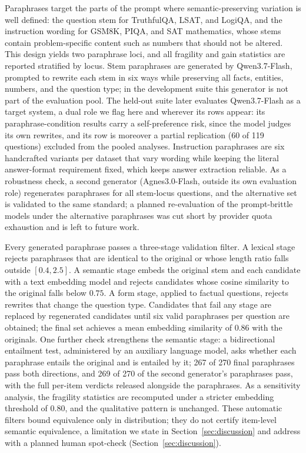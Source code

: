 Paraphrases target the parts of the prompt where semantic-preserving variation is well defined: the question stem for TruthfulQA, LSAT, and LogiQA, and the instruction wording for GSM8K, PIQA, and SAT mathematics, whose stems contain problem-specific content such as numbers that should not be altered. This design yields two paraphrase loci, and all fragility and gain statistics are reported stratified by locus. Stem paraphrases are generated by Qwen3.7-Flash, prompted to rewrite each stem in six ways while preserving all facts, entities, numbers, and the question type; in the development suite this generator is not part of the evaluation pool. The held-out suite later evaluates Qwen3.7-Flash as a target system, a dual role we flag here and wherever its rows appear: its paraphrase-condition results carry a self-preference risk, since the model judges its own rewrites, and its row is moreover a partial replication (60 of 119 questions) excluded from the pooled analyses. Instruction paraphrases are six handcrafted variants per dataset that vary wording while keeping the literal answer-format requirement fixed, which keeps answer extraction reliable. As a robustness check, a second generator (Agnes3.0-Flash, outside its own evaluation role) regenerates paraphrases for all stem-locus questions, and the alternative set is validated to the same standard; a planned re-evaluation of the prompt-brittle models under the alternative paraphrases was cut short by provider quota exhaustion and is left to future work.

Every generated paraphrase passes a three-stage validation filter. A lexical stage rejects paraphrases that are identical to the original or whose length ratio falls outside $[0.4, 2.5]$. A semantic stage embeds the original stem and each candidate with a text embedding model and rejects candidates whose cosine similarity to the original falls below $0.75$. A form stage, applied to factual questions, rejects rewrites that change the question type. Candidates that fail any stage are replaced by regenerated candidates until six valid paraphrases per question are obtained; the final set achieves a mean embedding similarity of $0.86$ with the originals. One further check strengthens the semantic stage: a bidirectional entailment test, administered by an auxiliary language model, asks whether each paraphrase entails the original and is entailed by it; 267 of 270 final paraphrases pass both directions, and 269 of 270 of the second generator's paraphrases pass, with the full per-item verdicts released alongside the paraphrases. As a sensitivity analysis, the fragility statistics are recomputed under a stricter embedding threshold of $0.80$, and the qualitative pattern is unchanged. These automatic filters bound equivalence only in distribution; they do not certify item-level semantic equivalence, a limitation we state in Section~\ref{sec:discussion} and address with a planned human spot-check (Section~\ref{sec:discussion}).

